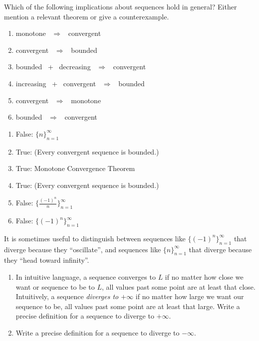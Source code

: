 \documentclass[12pt]{amsart}
\numberwithin{equation}{section}
\theoremstyle{plain} %
\theoremstyle{definition}
\theoremstyle{remark}
\begin{document}
\noindent Which of the following implications about sequences hold in general? Either mention a relevant theorem or give a counterexample.
	
\begin{multicols}{2}
\begin{enumerate}[label=(\alph*)]
\item monotone \ $\Longrightarrow$ \ convergent
\item convergent \ $\Longrightarrow$ \ bounded
\item bounded \ + \ decreasing  \ $\Longrightarrow$ \ convergent
\item increasing \ + \ convergent  \ $\Longrightarrow$ \ bounded
\item convergent  \ $\Longrightarrow$ \ monotone
\item bounded \ $\Longrightarrow$ \ convergent
\end{enumerate}
\end{multicols}

\begin{framed}
\begin{enumerate}[label=(\alph*)]
\item False: $\{ n\}_{n=1}^\infty$
\item True: (Every convergent sequence is bounded.)
\item True: Monotone Convergence Theorem
\item True: (Every convergent sequence is bounded.)
\item False: $\{ \frac{(-1)^n}{n}\}_{n=1}^\infty$
\item False: $\{ {(-1)^n}\}_{n=1}^\infty$
\end{enumerate}
\end{framed}


	
\noindent It is sometimes useful to distinguish between sequences like $\{(-1)^n\}_{n=1}^\infty$
that diverge because they ``oscillate'', and sequences like $
\{n\}_{n=1}^\infty$
that diverge because they ``head toward infinity''.




\begin{enumerate}[label=(\Roman*)]

\item In intuitive language, a sequence converges to $L$ if no matter how close we want or sequence to be to $L$, all values past some point are at least that close. Intuitively, a sequence \emph{diverges to $+\infty$} if no matter how large we want our sequence to be, all values past some point are at least that large. Write a precise definition for a sequence to diverge to $+\infty$.



\item Write a precise definition for a sequence to diverge to $-\infty$.
\end{enumerate} 
\end{document}
